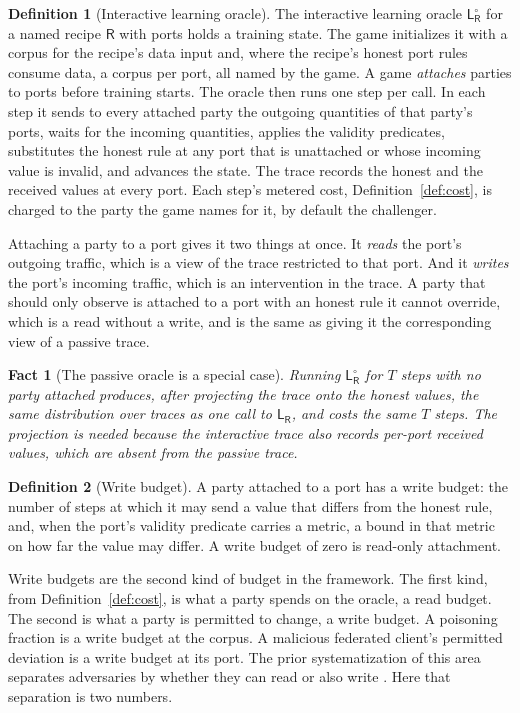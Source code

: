 \documentclass[11pt]{article}
\theoremstyle{definition}
\newtheorem{definition}{Definition}
\theoremstyle{plain}
\newtheorem{fact}{Fact}
\theoremstyle{remark}
\newcommand{\Lo}{\mathsf{L}}
\newcommand{\Rec}{\mathsf{R}}
\begin{document}
\begin{definition}[Interactive learning oracle]
\label{def:interactive}
The interactive learning oracle $\Lo^{\circ}_{\Rec}$ for a named recipe $\Rec$
with ports holds a training state. The game initializes it with a corpus for the
recipe's data input and, where the recipe's honest port rules consume data, a
corpus per port, all named by the game. A game \emph{attaches} parties to ports
before training starts. The oracle then runs one step per call. In each step it
sends to every attached party the outgoing quantities of that party's ports,
waits for the incoming quantities, applies the validity predicates, substitutes
the honest rule at any port that is unattached or whose incoming value is
invalid, and advances the state. The trace records the honest and the received
values at every port. Each step's metered cost, Definition~\ref{def:cost}, is
charged to the party the game names for it, by default the challenger.
\end{definition}

Attaching a party to a port gives it two things at once. It \emph{reads} the port's
outgoing traffic, which is a view of the trace restricted to that port. And it
\emph{writes} the port's incoming traffic, which is an intervention in the trace. A
party that should only observe is attached to a port with an honest rule it cannot
override, which is a read without a write, and is the same as giving it the
corresponding view of a passive trace.

\begin{fact}[The passive oracle is a special case]
Running $\Lo^{\circ}_{\Rec}$ for $T$ steps with no party attached produces, after
projecting the trace onto the honest values, the same distribution over traces
as one call to $\Lo_{\Rec}$, and costs the same $T$ steps. The projection is
needed because the interactive trace also records per-port received values,
which are absent from the passive trace.
\end{fact}

\begin{definition}[Write budget]
\label{def:write}
A party attached to a port has a write budget: the number of steps at which it may
send a value that differs from the honest rule, and, when the port's validity
predicate carries a metric, a bound in that metric on how far the value may
differ. A write budget of zero is read-only
attachment.
\end{definition}

Write budgets are the second kind of budget in the framework. The first kind, from
Definition~\ref{def:cost}, is what a party spends on the oracle, a read budget. The
second is what a party is permitted to change, a write budget. A poisoning fraction
is a write budget at the corpus. A malicious federated client's permitted deviation
is a write budget at its port. The prior systematization of this area separates
adversaries by whether they can read or also write \cite{PMSW18}. Here that
separation is two numbers.
\end{document}
